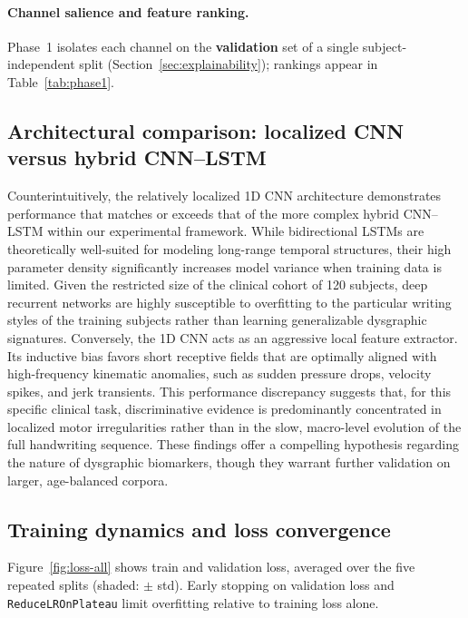 \documentclass{article}
\begin{document}
\paragraph{Channel salience and feature ranking.}
Phase~1 isolates each channel on the \textbf{validation} set of a single subject-independent split (Section~\ref{sec:explainability}); rankings appear in Table~\ref{tab:phase1}.


\subsection{Architectural comparison: localized CNN versus hybrid CNN--LSTM}
Counterintuitively, the relatively localized 1D CNN architecture demonstrates performance that matches or exceeds that of the more complex hybrid CNN--LSTM within our experimental framework. While bidirectional LSTMs are theoretically well-suited for modeling long-range temporal structures, their high parameter density significantly increases model variance when training data is limited. Given the restricted size of the clinical cohort of 120 subjects, deep recurrent networks are highly susceptible to overfitting to the particular writing styles of the training subjects rather than learning generalizable dysgraphic signatures. Conversely, the 1D CNN acts as an aggressive local feature extractor. Its inductive bias favors short receptive fields that are optimally aligned with high-frequency kinematic anomalies, such as sudden pressure drops, velocity spikes, and jerk transients. This performance discrepancy suggests that, for this specific clinical task, discriminative evidence is predominantly concentrated in localized motor irregularities rather than in the slow, macro-level evolution of the full handwriting sequence. These findings offer a compelling hypothesis regarding the nature of dysgraphic biomarkers, though they warrant further validation on larger, age-balanced corpora.

\subsection{Training dynamics and loss convergence}
Figure~\ref{fig:loss-all} shows train and validation loss, averaged over the five repeated splits (shaded: $\pm$ std). Early stopping on validation loss and \texttt{ReduceLROnPlateau} limit overfitting relative to training loss alone.
\end{document}
